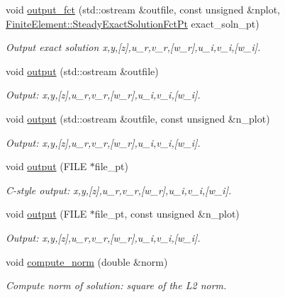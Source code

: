 \begin{DoxyCompactItemize}
void \hyperlink{classoomph_1_1TimeHarmonicLinearElasticityEquations_a9b7deca877e8fbb4b20d0f3e9f732e69}{output\+\_\+fct} (std\+::ostream \&outfile, const unsigned \&nplot, \hyperlink{classoomph_1_1FiniteElement_a690fd33af26cc3e84f39bba6d5a85202}{Finite\+Element\+::\+Steady\+Exact\+Solution\+Fct\+Pt} exact\+\_\+soln\+\_\+pt)
\begin{DoxyCompactList}\small\item\em Output exact solution x,y,\mbox{[}z\mbox{]},u\+\_\+r,v\+\_\+r,\mbox{[}w\+\_\+r\mbox{]},u\+\_\+i,v\+\_\+i,\mbox{[}w\+\_\+i\mbox{]}. \end{DoxyCompactList}\item 
void \hyperlink{classoomph_1_1TimeHarmonicLinearElasticityEquations_acbc7549f33300563f0a3953782fb4a46}{output} (std\+::ostream \&outfile)
\begin{DoxyCompactList}\small\item\em Output\+: x,y,\mbox{[}z\mbox{]},u\+\_\+r,v\+\_\+r,\mbox{[}w\+\_\+r\mbox{]},u\+\_\+i,v\+\_\+i,\mbox{[}w\+\_\+i\mbox{]}. \end{DoxyCompactList}\item 
void \hyperlink{classoomph_1_1TimeHarmonicLinearElasticityEquations_a5363121911a4418e2bfa707e02e2adc4}{output} (std\+::ostream \&outfile, const unsigned \&n\+\_\+plot)
\begin{DoxyCompactList}\small\item\em Output\+: x,y,\mbox{[}z\mbox{]},u\+\_\+r,v\+\_\+r,\mbox{[}w\+\_\+r\mbox{]},u\+\_\+i,v\+\_\+i,\mbox{[}w\+\_\+i\mbox{]}. \end{DoxyCompactList}\item 
void \hyperlink{classoomph_1_1TimeHarmonicLinearElasticityEquations_ab92581333fed6fcfd5267e3136c445c3}{output} (F\+I\+LE $\ast$file\+\_\+pt)
\begin{DoxyCompactList}\small\item\em C-\/style output\+: x,y,\mbox{[}z\mbox{]},u\+\_\+r,v\+\_\+r,\mbox{[}w\+\_\+r\mbox{]},u\+\_\+i,v\+\_\+i,\mbox{[}w\+\_\+i\mbox{]}. \end{DoxyCompactList}\item 
void \hyperlink{classoomph_1_1TimeHarmonicLinearElasticityEquations_a1913ef957b846a4bf04991718b83f9b5}{output} (F\+I\+LE $\ast$file\+\_\+pt, const unsigned \&n\+\_\+plot)
\begin{DoxyCompactList}\small\item\em Output\+: x,y,\mbox{[}z\mbox{]},u\+\_\+r,v\+\_\+r,\mbox{[}w\+\_\+r\mbox{]},u\+\_\+i,v\+\_\+i,\mbox{[}w\+\_\+i\mbox{]}. \end{DoxyCompactList}\item 
void \hyperlink{classoomph_1_1TimeHarmonicLinearElasticityEquations_a50a5236dcb29a7547a7e2fd75bf96b7f}{compute\+\_\+norm} (double \&norm)
\begin{DoxyCompactList}\small\item\em Compute norm of solution\+: square of the L2 norm. \end{DoxyCompactList}\end{DoxyCompactItemize}
